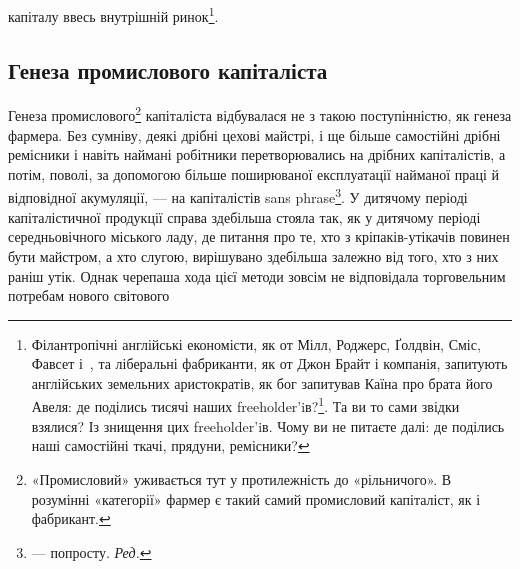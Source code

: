 капіталу ввесь внутрішній ринок\footnote{
Філантропічні англійські економісти, як от Мілл, Роджерс, Ґолдвін,
Сміс, Фавсет і~, та ліберальні фабриканти, як от Джон Брайт
і компанія, запитують англійських земельних аристократів, як бог
запитував Каїна про брата його Авеля: де поділись тисячі наших freeholder’iв?\footnote*{
— самостійних селян. \emph{Ред.}
}.
Та ви то сами звідки взялися? Із знищення цих freeholder’iв.
Чому ви не питаєте далі: де поділись наші самостійні ткачі, прядуни,
ремісники?
}.

\subsection{Генеза промислового капіталіста}

Генеза промислового\footnote{
«Промисловий» уживається тут у протилежність до «рільничого».
В розумінні «категорії» фармер є такий самий промисловий капіталіст,
як і фабрикант.
} капіталіста відбувалася не з такою
поступінністю, як генеза фармера. Без сумніву, деякі дрібні
цехові майстрі, і ще більше самостійні дрібні ремісники і навіть
наймані робітники перетворювались на дрібних капіталістів,
а потім, поволі, за допомогою більше поширюваної експлуатації
найманої праці й відповідної акумуляції, — на капіталістів sans
phrase\footnote*{
— попросту. \emph{Ред.}
}. У дитячому періоді капіталістичної продукції справа
здебільша стояла так, як у дитячому періоді середньовічного
міського ладу, де питання про те, хто з кріпаків-утікачів повинен
бути майстром, а хто слугою, вирішувано здебільша залежно
від того, хто з них раніш утік. Однак черепаша хода цієї методи
зовсім не відповідала торговельним потребам нового світового
\parbreak{}  %
